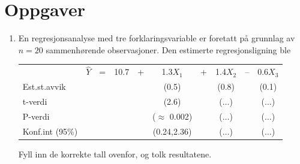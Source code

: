 \section{Oppgaver}
\small
\begin{enumerate}

\item  En regresjonsanalyse med tre forklaringsvariable er foretatt
på grunnlag av $n=20$ sammenhørende observasjoner.
Den estimerte regresjonsligning ble
\begin{center} \addtolength{\tabcolsep}{-0.2\tabcolsep}
\begin{tabular}{lccccccccc} 
 &$\hat{Y}$ &=& 10.7& + & 1.3$X_1$& + & 1.4$X_2$&--&0.6$X_3$ \\
Est.st.avvik& & & & &(0.5)  & &   (0.8)  & & (0.1) \\
t-verdi     & & & & &(2.6)  & &   ($\ldots$)  & & ($\ldots$) \\
P-verdi     & & & & & ($\approx$ 0.002) & &  ($\ldots$)  & & ($\ldots$) \\
Konf.int (95\%)& & & & & (0.24,2.36)& & ($\ldots$) & &  ($\ldots$)
\end{tabular}
\end{center}
Fyll inn de korrekte tall ovenfor, og tolk resultatene.


\end{enumerate}
